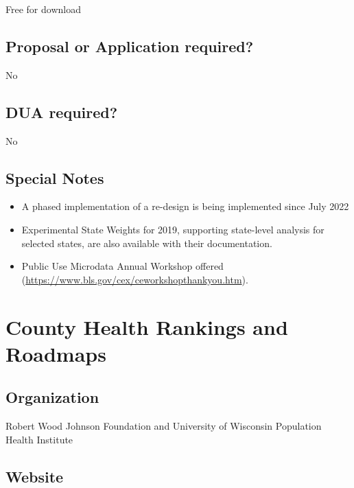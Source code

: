 \documentclass[
]{book}
\providecommand{\tightlist}{%
  \setlength{\itemsep}{0pt}\setlength{\parskip}{0pt}}
\begin{document}
Free for download

\hypertarget{proposal-or-application-required-19}{%
\section{Proposal or Application required?}\label{proposal-or-application-required-19}}

No

\hypertarget{dua-required-19}{%
\section{DUA required?}\label{dua-required-19}}

No

\hypertarget{special-notes-19}{%
\section{Special Notes}\label{special-notes-19}}

\begin{itemize}
\tightlist
\item
  A phased implementation of a re-design is being implemented since July 2022
\item
  Experimental State Weights for 2019, supporting state-level analysis for selected states, are also available with their documentation.
\item
  Public Use Microdata Annual Workshop offered (\url{https://www.bls.gov/cex/ceworkshopthankyou.htm}).
\end{itemize}

\mainmatter

\hypertarget{county-health-rankings-and-roadmaps}{%
\chapter{County Health Rankings and Roadmaps}\label{county-health-rankings-and-roadmaps}}

\hypertarget{organization-20}{%
\section{Organization}\label{organization-20}}

Robert Wood Johnson Foundation and University of Wisconsin Population Health Institute

\hypertarget{website-20}{%
\section{Website}\label{website-20}}
\end{document}
